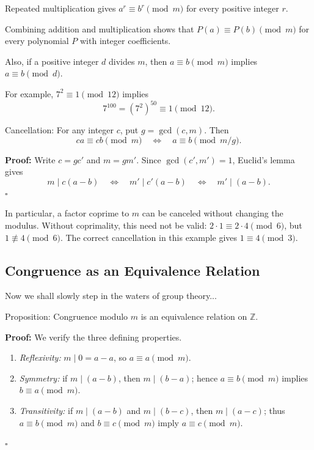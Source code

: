 \documentclass[a4paper,11pt,abstracton]{scrartcl}
\theoremstyle{dotlessP}
\theoremstyle{dotlessS}
\theoremstyle{remark}
\theoremstyle{definition}
\begin{document}
\begin{remark_box}
Repeated multiplication gives $a^r\equiv b^r\pmod m$ for every
positive integer $r$.
\end{remark_box}

\begin{remark_box}
 Combining addition and multiplication shows that
$P(a)\equiv P(b)\pmod m$ for every polynomial $P$ with integer
coefficients. 
\end{remark_box}

\begin{remark_box}
Also, if a positive integer $d$ divides $m$, then
$a\equiv b\pmod m$ implies $a\equiv b\pmod d$.
\end{remark_box}

\begin{example_box}
For example, $7^2\equiv1\pmod{12}$ implies
\[
    7^{100}=(7^2)^{50}\equiv1\pmod{12}.
\]
\end{example_box}


\begin{mainbox}{Cancellation:}
For any integer $c$, put $g=\gcd(c,m)$. Then
\[
    ca\equiv cb\pmod m
    \quad\Longleftrightarrow\quad
    a\equiv b\pmod{m/g}.
\]
\end{mainbox}
\textbf{Proof:}
Write $c=gc'$ and $m=gm'$. Since $\gcd(c',m')=1$, Euclid's lemma gives
\[
    m\mid c(a-b)
    \quad\Longleftrightarrow\quad m'\mid c'(a-b)
    \quad\Longleftrightarrow\quad m'\mid(a-b).
\]
\hfill$\square$



\begin{example_box}
In particular, a factor coprime to $m$ can be canceled without changing
the modulus. Without coprimality, this need not be valid:
$2\cdot1\equiv2\cdot4\pmod6$, but $1\not\equiv4\pmod6$.
The correct cancellation in this example gives $1\equiv4\pmod3$.
\end{example_box}


\subsection{Congruence as an Equivalence Relation}
Now we shall slowly step in the waters of group theory...
\begin{mainbox}{Proposition:}
Congruence modulo $m$ is an equivalence relation on $\mathbb{Z}$.
\end{mainbox}

\textbf{Proof:}
We verify the three defining properties.
\begin{enumerate}
    \item \emph{Reflexivity:} $m\mid0=a-a$, so $a\equiv a\pmod m$.
    \item \emph{Symmetry:} if $m\mid(a-b)$, then $m\mid(b-a)$;
    hence $a\equiv b\pmod m$ implies $b\equiv a\pmod m$.
    \item \emph{Transitivity:} if $m\mid(a-b)$ and $m\mid(b-c)$,
    then $m\mid(a-c)$; thus $a\equiv b\pmod m$ and
    $b\equiv c\pmod m$ imply $a\equiv c\pmod m$.
\end{enumerate}
\hfill$\square$
\end{document}
